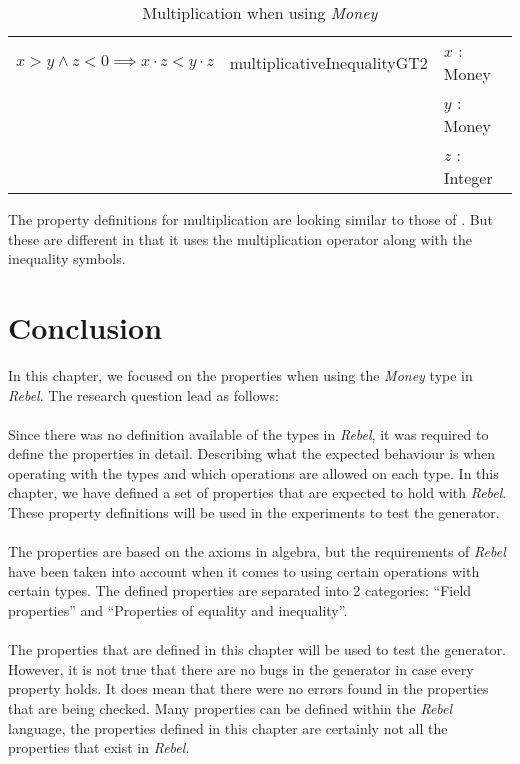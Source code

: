 \begin{table}[!ht]
\begin{tabular}{lll}
\rowcolor[HTML]{EFEFEF} $x > y \land z < 0 \implies x \cdot z < y \cdot z$ & multiplicativeInequalityGT2 & $x$ : Money              \\
\rowcolor[HTML]{EFEFEF}                                                    &                             & $y$ : Money              \\
\rowcolor[HTML]{EFEFEF}                                                    &                             & $z$ : Integer            \\ \hline
\end{tabular}
\caption{Multiplication when using \textit{Money}}
\label{tbl:properties_money_multiplication_updated}
\end{table}
\FloatBarrier\noindent
The property definitions for multiplication are looking similar to those of
. But these are different in that it
uses the multiplication operator along with the inequality symbols.

\section{Conclusion}
In this chapter, we focused on the properties when using the \textit{Money}
type in \textit{Rebel}. The research question lead as follows:\rqOne\\
\\
Since there was no definition available of the types in \textit{Rebel}, it was
required to define the properties in detail. Describing what the expected
behaviour is when operating with the types and which operations are allowed on
each type. In this chapter, we have defined a set of properties that are
expected to hold with \textit{Rebel}. These property definitions will be used in the experiments to test the generator.\\
\\
The properties are based on the axioms in algebra, but the requirements of
\textit{Rebel} have been taken into account when it comes to using certain
operations with certain types. The defined properties are separated into 2
categories: ``Field properties'' and ``Properties of equality and inequality''.
\\
\\
The properties that are defined in this chapter will be used to test the
generator. However, it is not true that there are no bugs in the generator in
case every property holds. It does mean that there were no errors found in the
properties that are being checked. Many properties can be defined within the
\textit{Rebel} language, the properties defined in this chapter are certainly
not all the properties that exist in \textit{Rebel}.

